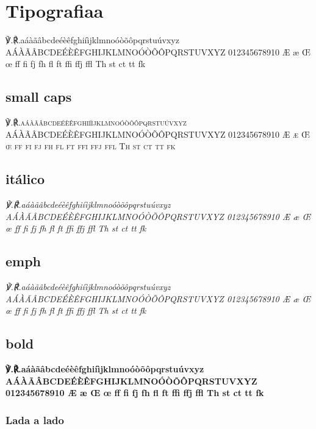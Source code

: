\documentclass[10pt,oneside,openany]{scrbook}
\newcommand{\alfa}{℣.℟.aáàãâbcdeéèêfghiíìjklmnoóòõôpqrstuúvxyz
AÁÀÃÂBCDEÉÈÊFGHIJKLMNOÓÒÕÔPQRSTUVXYZ
012345678910 Æ æ Œ œ ff fi fj fh fl ft  ffi ffj ffl Th st ct tt fk}
\begin{document}
\section{Tipografiaa}
\alfa

\subsection{small caps}

\textsc{\alfa}

\subsection{itálico}

\textit{\alfa}

\subsection{emph}

\emph{\alfa}

\subsection{bold}

\textbf{\alfa}

\subsubsection{Lada a lado}

\begin{paracol}{2}
 \lipsum[1]
\switchcolumn
{} \lipsum[2]
\switchcolumn*
{} \lipsum[3]
\switchcolumn
{} \lipsum[4]
\switchcolumn*
\lipsum[5]
\switchcolumn
\lipsum[6]
\switchcolumn*
\lipsum[7]
\switchcolumn
\lipsum[8]
\switchcolumn*
\lipsum[9]
\switchcolumn
\lipsum[10]
\switchcolumn*
\lipsum[11]
\switchcolumn
\lipsum[12]
\switchcolumn*
\lipsum[13]
\switchcolumn
\lipsum[14]
\switchcolumn*
\lipsum[15]
\switchcolumn
\lipsum[16]
\end{paracol}
\end{document}

